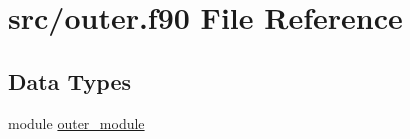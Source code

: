 \hypertarget{outer_8f90}{\section{src/outer.f90 File Reference}
\label{outer_8f90}
}
\subsection*{Data Types}
\begin{DoxyCompactItemize}
\item 
module \hyperlink{classouter__module}{outer\-\_\-module}
\end{DoxyCompactItemize}
